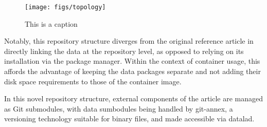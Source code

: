 
\begin{figure}
	\centering
	\texttt{[image: figs/topology]}
	\caption{
		This is a caption
	}
	\label{fig:topology}
\end{figure}

Notably, this repository structure diverges from the original reference article in directly linking the data at the repository level, as opposed to relying on its installation via the package manager.
Within the context of container usage, this affords the advantage of keeping the data packages separate and not adding their disk space requirements to those of the container image.

In this novel repository structure, external components of the article are managed as Git submodules, with data sumbodules being handled by git-annex, a versioning technology suitable for binary files, and made accessible via datalad. 

